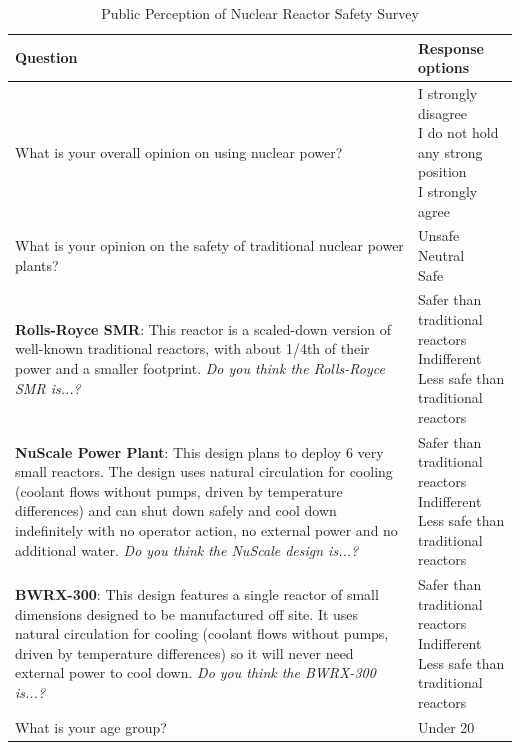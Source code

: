 \begin{table}[ht]
\centering
\caption{Public Perception of Nuclear Reactor Safety Survey}
\label{tab:nuclear_survey}
\setlength{\extrarowheight}{2pt}
\footnotesize
\begin{tabularx}{\textwidth}{>{\raggedright\arraybackslash}X >{\raggedright\arraybackslash}X}
	\toprule
	\textbf{Question} & \textbf{Response options} \\
\midrule
What is your overall opinion on using nuclear power? & \makecell[l]{I strongly disagree \\
I do not hold any strong position \\
I strongly agree} \\
\midrule
What is your opinion on the safety of traditional nuclear power plants? & \makecell[l]{Unsafe \\
Neutral \\
Safe} \\
\midrule
\textbf{Rolls-Royce SMR}: This reactor is a scaled-down version of well-known traditional reactors, with about 1/4th of their power and a smaller footprint. \textit{Do you think the Rolls-Royce SMR is...?} & \makecell[l]{Safer than traditional reactors \\
Indifferent \\
Less safe than traditional reactors} \\
\midrule
\textbf{NuScale Power Plant}: This design plans to deploy 6 very small reactors. The design uses natural circulation for cooling (coolant flows without pumps, driven by temperature differences) and can shut down safely and cool down indefinitely with no operator action, no external power and no additional water. \textit{Do you think the NuScale design is...?} & \makecell[l]{Safer than traditional reactors \\
Indifferent \\
Less safe than traditional reactors} \\
\midrule
\textbf{BWRX-300}: This design features a single reactor of small dimensions designed to be manufactured off site. It uses natural circulation for cooling (coolant flows without pumps, driven by temperature differences) so it will never need external power to cool down. \textit{Do you think the BWRX-300 is...?} & \makecell[l]{Safer than traditional reactors \\
Indifferent \\
Less safe than traditional reactors} \\
\midrule
What is your age group? & \makecell[l]{Under 20 \\
}
\end{tabularx}
\end{table}
